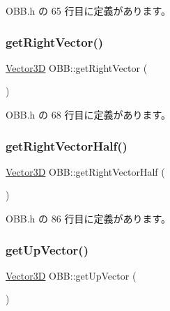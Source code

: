  O\+B\+B.\+h の 65 行目に定義があります。

\mbox{\label{class_o_b_b_a7879aad21978ea9dfc5f50a608349b27}} 
\subsubsection{\texorpdfstring{get\+Right\+Vector()}{getRightVector()}}
{\footnotesize\ttfamily \mbox{\hyperlink{class_vector3_d}{Vector3D}} O\+B\+B\+::get\+Right\+Vector (\begin{DoxyParamCaption}{ }\end{DoxyParamCaption})\hspace{0.3cm}{\ttfamily [inline]}}



 O\+B\+B.\+h の 68 行目に定義があります。

\mbox{\label{class_o_b_b_ab0452e841ab2c1362b2e6365b27cea97}} 
\subsubsection{\texorpdfstring{get\+Right\+Vector\+Half()}{getRightVectorHalf()}}
{\footnotesize\ttfamily \mbox{\hyperlink{class_vector3_d}{Vector3D}} O\+B\+B\+::get\+Right\+Vector\+Half (\begin{DoxyParamCaption}{ }\end{DoxyParamCaption})\hspace{0.3cm}{\ttfamily [inline]}}



 O\+B\+B.\+h の 86 行目に定義があります。

\mbox{\label{class_o_b_b_a73da06fa4dbebb2b59dc3168971c8d5d}} 
\subsubsection{\texorpdfstring{get\+Up\+Vector()}{getUpVector()}}
{\footnotesize\ttfamily \mbox{\hyperlink{class_vector3_d}{Vector3D}} O\+B\+B\+::get\+Up\+Vector (\begin{DoxyParamCaption}{ }\end{DoxyParamCaption})\hspace{0.3cm}{\ttfamily [inline]}}



